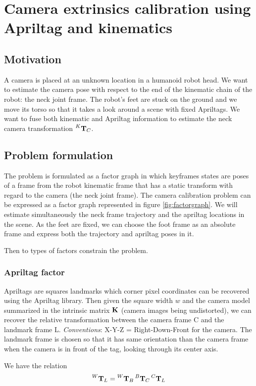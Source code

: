 \documentclass[11pt]{article}
\newcommand{\T}[2]{\prescript{#1}{}{\bfT}_{#2}}
\begin{document}
\section{Camera extrinsics calibration using Apriltag and kinematics}
\subsection{Motivation}
A camera is placed at an unknown location in a humanoid robot head. We want to estimate the camera pose with respect to the end of the kinematic chain of the robot: the neck joint frame.
The robot's feet are stuck on the ground and we move its torso so that it takes a look around a scene with fixed Apriltags. We want to fuse both kinematic and Apriltag information to estimate the neck camera transformation $\T{K}{C}$.

\subsection{Problem formulation}
The problem is formulated as a factor graph in which keyframes states are poses of a frame from the robot kinematic frame that has a static transform with regard to the camera (the neck joint frame). The camera calibration problem can be expressed as a factor graph represented in figure \ref{fig:factorgraph}. We will estimate simultaneously the neck frame trajectory and the apriltag locations in the scene. As the feet are fixed, we can choose the foot frame as an absolute frame and express both the trajectory and apriltag poses in it.

Then to types of factors constrain the problem.

\subsubsection*{Apriltag factor}
Apriltags are squares landmarks which corner pixel coordinates can be recovered using the Apriltag library. Then given the square width $w$ and the camera model summarized in the intrinsic matrix ${\bf K}$ (camera images being undistorted), we can recover the relative transformation between the camera frame C and the landmark frame L.
\textit{Conventions}: X-Y-Z = Right-Down-Front for the camera. The landmark frame is chosen so that it has same orientation than the camera frame when the camera is in front of the tag, looking through its center axis.

We have the relation 
\begin{equation}
    \T{W}{L} = \T{W}{B}\T{B}{C}\T{C}{L}
\end{equation}
\end{document}
